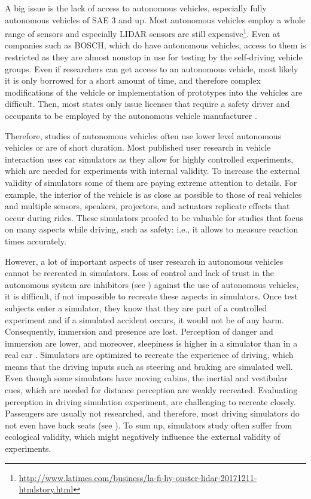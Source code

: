 A big issue is the lack of access to autonomous vehicles, especially fully autonomous vehicles of SAE 3 and up. Most autonomous vehicles employ a whole range of sensors and especially LIDAR sensors are still expensive\footnote{\url{http://www.latimes.com/business/la-fi-hy-ouster-lidar-20171211-htmlstory.html}}. Even at companies such as BOSCH, which do have autonomous vehicles, access to them is restricted as they are almost nonstop in use for testing by the self-driving vehicle groups. Even if researchers can get access to an autonomous vehicle, most likely it is only borrowed for a short amount of time, and therefore complex modifications of the vehicle or implementation of prototypes into the vehicles are difficult. Then, most states only issue licenses that require a safety driver and occupants to be employed by the autonomous vehicle manufacturer \citep[see][]{Jones2013AutonomousReport}. 

Therefore, studies of autonomous vehicles often use lower level autonomous vehicles or are of short duration. 
Most published user research in vehicle interaction uses car simulators as they allow for highly controlled experiments, which are needed for experiments with internal validity. To increase the external validity of simulators some of them are paying extreme attention to details. For example, the interior of the vehicle is as close as possible to those of real vehicles and multiple sensors, speakers, projectors, and actuators replicate effects that occur during rides. These simulators proofed to be valuable for studies that focus on many aspects while driving, such as safety: i.e., it allows to measure reaction times accurately. 

However, a lot of important aspects of user research in autonomous vehicles cannot be recreated in simulators. Loss of control and lack of trust in the autonomous system are inhibitors (see \emph{}) against the use of autonomous vehicles, it is difficult, if not impossible to recreate these aspects in simulators. Once test subjects enter a simulator, they know that they are part of a controlled experiment and if a simulated accident occurs, it would not be of any harm. Consequently, immersion and presence are lost. Perception of danger and immersion are lower, and moreover, sleepiness is higher in a simulator than in a real car \citep{Hallvig2013}.
Simulators are optimized to recreate the experience of driving, which means that the driving inputs such as steering and braking are simulated well. Even though some simulators have moving cabins, the inertial and vestibular cues, which are needed for distance perception are weakly recreated. Evaluating perception in driving simulation experiment, are challenging to recreate closely. Passengers are usually not researched, and therefore, most driving simulators do not even have back seats (see \emph{}). To sum up, simulators study often suffer from ecological validity, which might negatively influence the external validity of experiments. 

